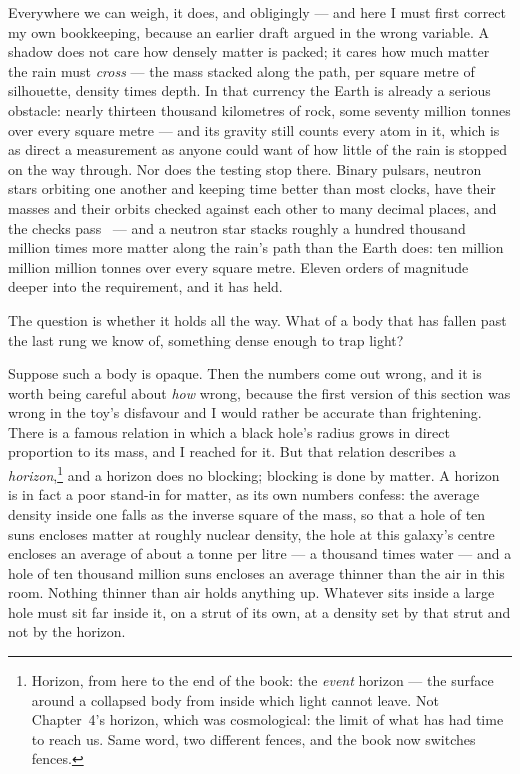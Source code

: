 \documentclass[fontsize=11pt,paper=a4,pagesize=auto,parskip=half-]{scrbook}
\newcommand{\Ixtmp}{}
\DeclareRobustCommand{\Ix}[1]{%
  #1%
  \begingroup
    \lowercase{\gdef\Ixtmp{#1}}%
    \expandafter\index\expandafter{\Ixtmp}%
  \endgroup}
\begin{document}
Everywhere we can weigh, it does, and obligingly --- and here I must first correct my own bookkeeping, because an earlier draft argued in the wrong variable. A shadow does not care how densely matter is packed; it cares how much matter the rain must \emph{cross} --- the mass stacked along the path, per square metre of silhouette, density times depth. In that currency the Earth is already a serious obstacle: nearly thirteen thousand kilometres of rock, some seventy million tonnes over every square metre --- and its gravity still counts every atom in it, which is as direct a measurement as anyone could want of how little of the rain is stopped on the way through. Nor does the testing stop there. Binary pulsars, neutron stars orbiting one another and keeping time better than most clocks, have their masses and their orbits checked against each other to many decimal places, and the checks pass~\cite{kramer2021} --- and a \Ix{neutron star} stacks roughly a hundred thousand million times more matter along the rain's path than the Earth does: ten million million million tonnes over every square metre. Eleven orders of magnitude deeper into the requirement, and it has held.

The question is whether it holds all the way. What of a body that has fallen past the last rung we know of, something dense enough to trap light?

Suppose such a body is opaque. Then the numbers come out wrong, and it is worth being careful about \emph{how} wrong, because the first version of this section was wrong in the toy's disfavour and I would rather be accurate than frightening. There is a famous relation in which a black hole's radius grows in direct proportion to its mass, and I reached for it. But that relation describes a \emph{horizon},\footnote{Horizon, from here to the end of the book: the \emph{event} horizon --- the surface around a collapsed body from inside which light cannot leave. Not Chapter~4's horizon, which was cosmological: the limit of what has had time to reach us. Same word, two different fences, and the book now switches fences.} and a horizon does no blocking; blocking is done by matter. A horizon is in fact a poor stand-in for matter, as its own numbers confess: the average density inside one falls as the inverse square of the mass, so that a hole of ten suns encloses matter at roughly nuclear density, the hole at this galaxy's centre encloses an average of about a tonne per litre --- a thousand times water --- and a hole of ten thousand million suns encloses an average thinner than the air in this room. Nothing thinner than air holds anything up. Whatever sits inside a large hole must sit far inside it, on a strut of its own, at a density set by that strut and not by the horizon.
\end{document}
